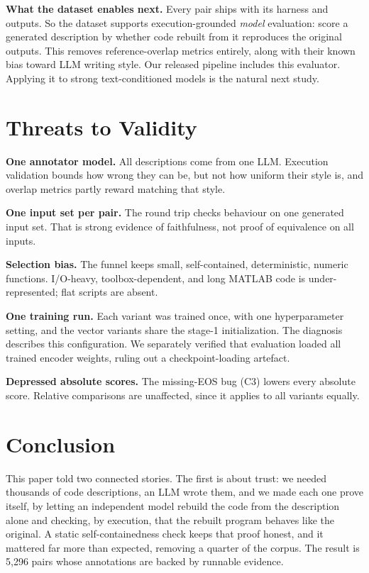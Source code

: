 \documentclass[conference]{IEEEtran}
\newcommand{\NAccepted}{5{,}296}           %
\begin{document}
\textbf{What the dataset enables next.} Every pair ships with its harness and outputs. So the dataset supports execution-grounded \emph{model} evaluation: score a generated description by whether code rebuilt from it reproduces the original outputs. This removes reference-overlap metrics entirely, along with their known bias toward LLM writing style. Our released pipeline includes this evaluator. Applying it to strong text-conditioned models is the natural next study.

\section{Threats to Validity}
\label{sec:threats}

\textbf{One annotator model.} All descriptions come from one LLM. Execution validation bounds how wrong they can be, but not how uniform their style is, and overlap metrics partly reward matching that style.

\textbf{One input set per pair.} The round trip checks behaviour on one generated input set. That is strong evidence of faithfulness, not proof of equivalence on all inputs.

\textbf{Selection bias.} The funnel keeps small, self-contained, deterministic, numeric functions. I/O-heavy, toolbox-dependent, and long MATLAB code is under-represented; flat scripts are absent.

\textbf{One training run.} Each variant was trained once, with one hyperparameter setting, and the vector variants share the stage-1 initialization. The diagnosis describes this configuration. We separately verified that evaluation loaded all trained encoder weights, ruling out a checkpoint-loading artefact.

\textbf{Depressed absolute scores.} The missing-EOS bug (C3) lowers every absolute score. Relative comparisons are unaffected, since it applies to all variants equally.

\section{Conclusion}

This paper told two connected stories. The first is about trust: we needed thousands of code descriptions, an LLM wrote them, and we made each one prove itself, by letting an independent model rebuild the code from the description alone and checking, by execution, that the rebuilt program behaves like the original. A static self-containedness check keeps that proof honest, and it mattered far more than expected, removing a quarter of the corpus. The result is \NAccepted{} pairs whose annotations are backed by runnable evidence.
\end{document}
